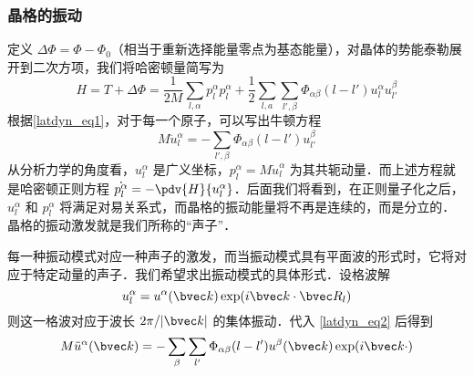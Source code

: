 \subsubsection{晶格的振动}
定义 $\Delta \Phi=\Phi-\Phi_0$（相当于重新选择能量零点为基态能量），对晶体的势能泰勒展开到二次方项，我们将哈密顿量简写为
\begin{equation}
H=T+\Delta \Phi=\frac{1}{2M}\sum_{l,\alpha}p_l^\alpha p_l^\alpha + \frac{1}{2}\sum_{l,a}\sum_{l',\beta}\Phi_{\alpha\beta}(l-l')u_l^\alpha u_{l'}^\beta
\end{equation}
根据\autoref{latdyn_eq1}，对于每一个原子，可以写出牛顿方程
\begin{equation}\label{latdyn_eq2}
M \ddot{u}_l^\alpha = -\sum_{l',\beta}\Phi_{\alpha\beta}(l-l')u_{l'}^\beta
\end{equation}
从分析力学的角度看，$u_l^\alpha$ 是广义坐标，$p_l^\alpha=M\dot{u}_l^\alpha$ 为其共轭动量．而上述方程就是哈密顿正则方程 $\dot{p_l^\alpha}=-\pdv{H}{u_l^\alpha}$．后面我们将看到，在正则量子化之后，$u_l^\alpha$ 和 $p_l^\alpha$ 将满足对易关系式，而晶格的振动能量将不再是连续的，而是分立的．晶格的振动激发就是我们所称的“声子”．

每一种振动模式对应一种声子的激发，而当振动模式具有平面波的形式时，它将对应于特定动量的声子．我们希望求出振动模式的具体形式．设格波解
\begin{equation}
u_l^\alpha = u^\alpha(\bvec k) \exp(i\bvec k\cdot \bvec R_l)
\end{equation}
则这一格波对应于波长 $2\pi/|\bvec k|$ 的集体振动．代入 \autoref{latdyn_eq2} 后得到
\begin{equation}
M\ddot{u}^\alpha(\bvec k)=-\sum_{\beta}\sum_{l'}\Phi_{\alpha\beta}(l-l')u^\beta(\bvec k)\exp(i\bvec k\cdot)
\end{equation}

